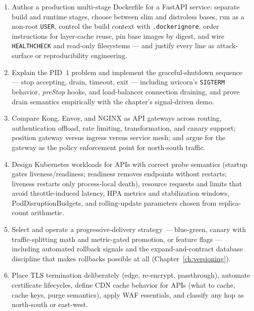 \begin{enumerate}[label=\textbf{LO-\arabic*.}, leftmargin=2.6cm]
  \item Author a production multi-stage Dockerfile for a FastAPI service:
        separate build and runtime stages, choose between slim and
        distroless bases, run as a non-root \texttt{USER}, control the
        build context with \texttt{.dockerignore}, order instructions for
        layer-cache reuse, pin base images by digest, and wire
        \texttt{HEALTHCHECK} and read-only filesystems --- and justify
        every line as attack-surface or reproducibility engineering.
  \item Explain the PID~1 problem and implement the graceful-shutdown
        sequence --- stop accepting, drain, timeout, exit --- including
        uvicorn's \texttt{SIGTERM} behavior, \emph{preStop} hooks, and
        load-balancer connection draining, and prove drain semantics
        empirically with the chapter's signal-driven demo.
  \item Compare Kong, Envoy, and NGINX as API gateways across routing,
        authentication offload, rate limiting, transformation, and canary
        support; position gateway versus ingress versus service mesh; and
        argue for the gateway as the policy enforcement point for
        north-south traffic.
  \item Design Kubernetes workloads for APIs with correct probe semantics
        (startup gates liveness/readiness; readiness removes endpoints
        without restarts; liveness restarts only process-local death),
        resource requests and limits that avoid throttle-induced latency,
        HPA metrics and stabilization windows, PodDisruptionBudgets, and
        rolling-update parameters chosen from replica-count arithmetic.
  \item Select and operate a progressive-delivery strategy --- blue-green,
        canary with traffic-splitting math and metric-gated promotion, or
        feature flags --- including automated rollback signals and the
        expand-and-contract database discipline that makes rollbacks
        possible at all (Chapter~\ref{ch:versioning}).
  \item Place TLS termination deliberately (edge, re-encrypt,
        passthrough), automate certificate lifecycles, define CDN cache
        behavior for APIs (what to cache, cache keys, purge semantics),
        apply WAF essentials, and classify any hop as north-south or
        east-west.
\end{enumerate}

